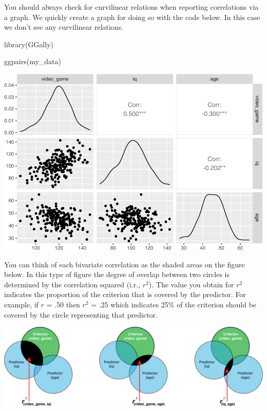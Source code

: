 \documentclass[
]{krantz}
\makeatletter
\newenvironment{Shaded}{\begin{snugshade}}{\end{snugshade}}
\newcommand{\FunctionTok}[1]{\textcolor[rgb]{0,0,0}{#1}}
\newcommand{\NormalTok}[1]{#1}
\newenvironment{kframe}{%
\medskip{}
\setlength{\fboxsep}{.8em}
 \def\at@end@of@kframe{}%
 \ifinner\ifhmode%
  \def\at@end@of@kframe{\end{minipage}}%
  \begin{minipage}{\columnwidth}%
 \fi\fi%
 \def\FrameCommand##1{\hskip\@totalleftmargin \hskip-\fboxsep
 \colorbox{shadecolor}{##1}\hskip-\fboxsep
     \hskip-\linewidth \hskip-\@totalleftmargin \hskip\columnwidth}%
 \MakeFramed {\advance\hsize-\width
   \@totalleftmargin\z@ \linewidth\hsize
   \@setminipage}}%
 {\par\unskip\endMakeFramed%
 \at@end@of@kframe}
\renewenvironment{Shaded}{\begin{kframe}}{\end{kframe}}
\makeatother
\begin{document}
You should always check for curvilinear relations when reporting correlations via a graph. We quickly create a graph for doing so with the code below. In this case we don't see any curvilinear relations.

\begin{Shaded}
\begin{Highlighting}[]
\FunctionTok{library}\NormalTok{(GGally)}

\FunctionTok{ggpairs}\NormalTok{(my\_data)}
\end{Highlighting}
\end{Shaded}

\includegraphics{bookdown_files/figure-latex/unnamed-chunk-435-1.pdf}

You can think of each bivariate correlation as the shaded areas on the figure below. In this type of figure the degree of overlap between two circles is determined by the correlation squared (i.r., \(r^2\)). The value you obtain for \(r^2\) indicates the proportion of the criterion that is covered by the predictor. For example, if \(r\) = .50 then \(r^2\) = .25 which indicates 25\% of the criterion should be covered by the circle representing that predictor.

\includegraphics[width=1\linewidth]{ch_multiple_regression/images/mr_venn_r}
\end{document}
